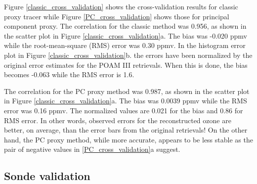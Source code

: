Figure \ref{classic_cross_validation} shows the cross-validation results
for classic proxy tracer while Figure \ref{PC_cross_validation} shows
those for principal component proxy.
The correlation for the classic method was 0.956, as shown in 
the scatter plot in Figure \ref{classic_cross_validation}a.
The bias was -0.020 ppmv while the root-mean-square (RMS) error was 0.30 ppmv.
In the histogram error plot in Figure \ref{classic_cross_validation}b.
the errors have been normalized by the original error estimates for the
POAM III retrievals.
When this is done, the bias becomes -0.063 while the RMS error is 1.6.

The correlation for the PC proxy method was 0.987, as shown in 
the scatter plot in Figure \ref{classic_cross_validation}a.
The bias was 0.0039 ppmv while the RMS error was 0.16 ppmv.
The normalized values are 0.021 for the bias and 0.86 for RMS error.
In other words, observed errors for the reconstructed ozone are better,
on average, than the error bars from the original retrievals!
On the other hand, the PC proxy method, while more accurate, appears to be
less stable as the pair of negative values in \ref{PC_cross_validation}a
suggest.

\subsection{Sonde validation}

